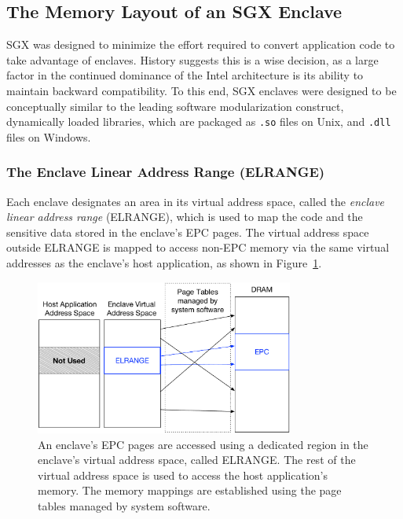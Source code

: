 \subsection{The Memory Layout of an SGX Enclave}
\label{sec:sgx_enclave_layout}

SGX was designed to minimize the effort required to convert application code to
take advantage of enclaves. History suggests this is a wise decision, as a
large factor in the continued dominance of the Intel architecture is its
ability to maintain backward compatibility. To this end, SGX enclaves were
designed to be conceptually similar to the leading software modularization
construct, dynamically loaded libraries, which are packaged as \texttt{.so}
files on Unix, and \texttt{.dll} files on Windows.


\subsubsection{The Enclave Linear Address Range (ELRANGE)}
\label{sec:sgx_elrange}


Each enclave designates an area in its virtual address space, called the
\textit{enclave linear address range} (ELRANGE), which is used to map the code
and the sensitive data stored in the enclave's EPC pages. The virtual address
space outside ELRANGE is mapped to access non-EPC memory via the same virtual
addresses as the enclave's host application, as shown in
Figure~\ref{fig:sgx_elrange}.

\begin{figure}[hbt]
  \centering
  \includegraphics[width=85mm]{figures/sgx_elrange.pdf}
  \caption{
    An enclave's EPC pages are accessed using a dedicated region in the
    enclave's virtual address space, called ELRANGE. The rest of the virtual
    address space is used to access the host application's memory. The memory
    mappings are established using the page tables managed by system software.
  }
  \label{fig:sgx_elrange}
\end{figure}

